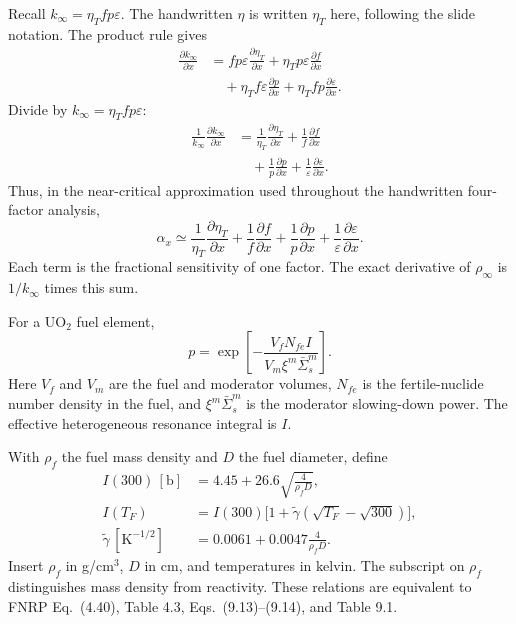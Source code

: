 \documentclass[compact]{ne630handout}
\begin{document}
\colnext
{}
Recall $k_\infty=\eta_Tfp\varepsilon$. The handwritten $\eta$ is written $\eta_T$ here, following the slide notation. The product rule gives
\begin{align*}
 \frac{\partial k_\infty}{\partial x}
 &=fp\varepsilon\frac{\partial\eta_T}{\partial x}
 +\eta_Tp\varepsilon\frac{\partial f}{\partial x}\\
 &\quad+\eta_Tf\varepsilon\frac{\partial p}{\partial x}
 +\eta_Tfp\frac{\partial\varepsilon}{\partial x}.
\end{align*}
Divide by $k_\infty=\eta_Tfp\varepsilon$:
\begin{align*}
 \frac1{k_\infty}\frac{\partial k_\infty}{\partial x}
 &=\frac1{\eta_T}\frac{\partial\eta_T}{\partial x}
 +\frac1f\frac{\partial f}{\partial x}\\
 &\quad+\frac1p\frac{\partial p}{\partial x}
 +\frac1\varepsilon\frac{\partial\varepsilon}{\partial x}.
\end{align*}
Thus, in the near-critical approximation used throughout the handwritten four-factor analysis,
$$
 \boxed{\alpha_x\simeq
 \frac1{\eta_T}\frac{\partial\eta_T}{\partial x}
 +\frac1f\frac{\partial f}{\partial x}
 +\frac1p\frac{\partial p}{\partial x}
 +\frac1\varepsilon\frac{\partial\varepsilon}{\partial x}.}
$$
Each term is the fractional sensitivity of one factor. The exact derivative of $\rho_\infty$ is $1/k_\infty$ times this sum.

For a UO$_2$ fuel element,
$$
 p=\exp\!\left[-\frac{V_fN_{fe}I}{V_m\xi^m\bar\Sigma_s^m}\right].
$$
Here $V_f$ and $V_m$ are the fuel and moderator volumes, $N_{fe}$ is the fertile-nuclide number density in the fuel, and $\xi^m\bar\Sigma_s^m$ is the moderator slowing-down power. The effective heterogeneous resonance integral is $I$.

\vspace{10pt}

With $\rho_f$ the fuel mass density and $D$ the fuel diameter, define
\begin{align*}
 I(300)\,[\mathrm b]&=4.45+26.6\sqrt{\frac4{\rho_fD}},\\
 I(T_F)&=I(300)\big[1+\tilde\gamma
 (\sqrt{T_F}-\sqrt{300})\big],\\
 \tilde\gamma\,[\mathrm{K}^{-1/2}]&=0.0061+0.0047\frac4{\rho_fD}.
\end{align*}
Insert $\rho_f$ in g/cm$^3$, $D$ in cm, and temperatures in kelvin. The subscript on $\rho_f$ distinguishes mass density from reactivity.  These relations are equivalent to FNRP Eq.\ (4.40), Table 4.3, Eqs.\ (9.13)--(9.14), and Table 9.1.
\end{document}
